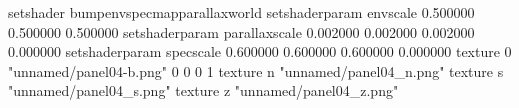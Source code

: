 setshader bumpenvspecmapparallaxworld
setshaderparam envscale 0.500000 0.500000 0.500000
setshaderparam parallaxscale 0.002000 0.002000 0.002000 0.000000
setshaderparam specscale 0.600000 0.600000 0.600000 0.000000
texture 0 "unnamed/panel04-b.png" 0 0 0 1
texture n "unnamed/panel04_n.png"
texture s "unnamed/panel04_s.png"
texture z "unnamed/panel04_z.png"
